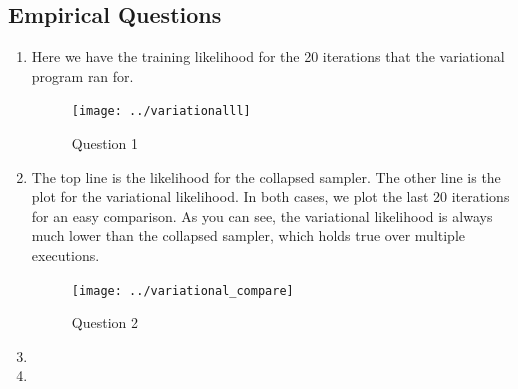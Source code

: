 \documentclass[11pt,a4paper]{article}
\begin{document}
	\setcounter{subsection}{2}
	\subsection{Empirical Questions}
	\begin{enumerate}
		\item Here we have the training likelihood for the 20 iterations
		that the variational program ran for.
		\begin{figure}[h]
			\caption{Question 1}
			\begin{center}
				\texttt{[image: ../variationalll]}
			\end{center}
		\end{figure}
		
		\item The top line is the likelihood for the collapsed sampler. The other
		line is the plot for the variational likelihood. In both cases, we plot the
		last 20 iterations for an easy comparison. As you can see, the variational
		likelihood is always much lower than the collapsed sampler, which holds
		true over multiple executions.
		\begin{figure}[h]
			\caption{Question 2}
			\begin{center}
				\texttt{[image: ../variational\_compare]}
			\end{center}
		\end{figure}
		\item
		\item
	\end{enumerate}
\end{document}
